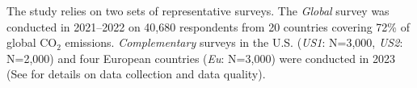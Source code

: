 \documentclass{nature}
\begin{document}
The study relies on two sets of representative surveys. The \textit{Global} survey was conducted in 2021--2022 on 40,680 respondents from 20 countries covering 72\% of global CO$_\text{2}$ emissions. \textit{Complementary} surveys in the U.S. (\textit{US1}: N=3,000, \textit{US2}: N=2,000) and four European countries (\textit{Eu}: N=3,000) were conducted in 2023 (See  for details on data collection and data quality).%

\end{document}
